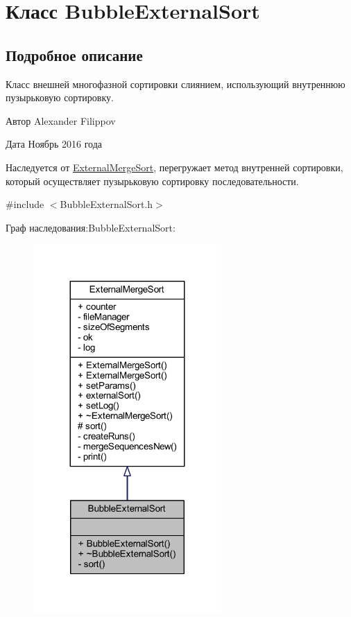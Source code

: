 \hypertarget{class_bubble_external_sort}{}\section{Класс Bubble\+External\+Sort}
\label{class_bubble_external_sort}


\subsection{Подробное описание}
Класс внешней многофазной сортировки слиянием, использующий внутреннюю пузырьковую сортировку. 

\begin{DoxyAuthor}{Автор}
Alexander Filippov 
\end{DoxyAuthor}
\begin{DoxyDate}{Дата}
Ноябрь 2016 года
\end{DoxyDate}
Наследуется от \hyperlink{class_external_merge_sort}{External\+Merge\+Sort}, перегружает метод внутренней сортировки, который осуществляет пузырьковую сортировку последовательности. 

{\ttfamily \#include $<$Bubble\+External\+Sort.\+h$>$}



Граф наследования\+:Bubble\+External\+Sort\+:\nopagebreak
\begin{figure}[H]
\begin{center}
\leavevmode
\includegraphics[width=203pt]{class_bubble_external_sort__inherit__graph}
\end{center}
\end{figure}



